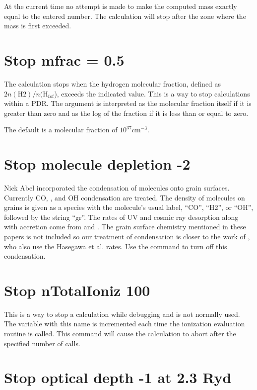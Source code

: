 At the current time no attempt is made to make the computed mass exactly
equal to the entered number.
The calculation will stop after the zone where
the mass is first exceeded.

\section{Stop mfrac = 0.5}

The calculation stops when the hydrogen molecular fraction, defined as
$2n(\mathrm{H}2)/n(\mathrm{H}_{tot}$), exceeds the indicated value.
This is a way to stop
calculations within a PDR.
The argument is interpreted as the molecular
fraction itself if it is greater than zero and as the log of the fraction
if it is less than or equal to zero.

The default is a molecular fraction of $10^{37} \mathrm{cm}^{-3}$.

\section{Stop molecule depletion -2}

Nick Abel incorporated the condensation of molecules onto grain surfaces.
Currently CO, \htwo, and OH condensation are treated.
The density of molecules
on grains is given as a species with the molecule's usual label, ``CO'',
``H2'', or ``OH'', followed by the string ``gr''.
The rates of UV and
cosmic ray desorption along with accretion come from \citet{Hasegawa1992} and \citet{Hasegawa1993}.
The grain surface chemistry
mentioned in these papers is not included so our treatment of condensation
is closer to the work of \citet{Bergin1995}, who also use
the Hasegawa et al. rates.
Use the  command
to turn off this condensation.

\section{Stop nTotalIoniz 100}

This is a way to stop a calculation while debugging and is not normally
used.
The variable with this name is incremented each time the ionization
evaluation routine is called.
This command will cause the calculation to
abort after the specified number of calls.

\section{Stop optical depth -1 at 2.3 Ryd}

